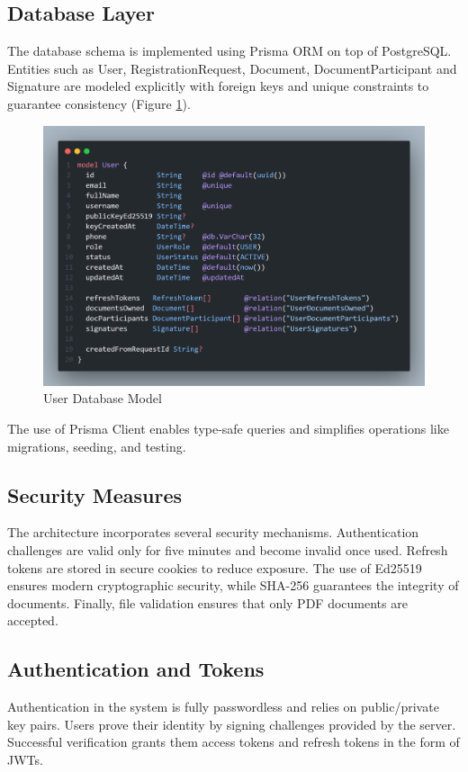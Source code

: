 \subsection{Database Layer}
The database schema is implemented using Prisma ORM on top of PostgreSQL. Entities such as User, RegistrationRequest, Document, DocumentParticipant and Signature are modeled explicitly with foreign keys and unique constraints to guarantee consistency (Figure \ref{user-db-model}). 

\begin{figure}[H]
    \centering
    \includegraphics[width=18cm]{"images/user-db-model.png"}
    \caption{User Database Model}
    \label{user-db-model}
\end{figure}

The use of Prisma Client enables type-safe queries and simplifies operations like migrations, seeding, and testing.

\subsection{Security Measures}
The architecture incorporates several security mechanisms. Authentication challenges are valid only for five minutes and become invalid once used. Refresh tokens are stored in secure cookies to reduce exposure. The use of Ed25519 ensures modern cryptographic security, while SHA-256 guarantees the integrity of documents. Finally, file validation ensures that only PDF documents are accepted.

\subsection{Authentication and Tokens}
Authentication in the system is fully passwordless and relies on public/private key pairs. Users prove their identity by signing challenges provided by the server. Successful verification grants them access tokens and refresh tokens in the form of JWTs.

